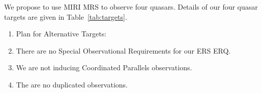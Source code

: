 
\smallskip \smallskip
\noindent
We propose to use MIRI MRS to observe four quasars. Details of our 
four quasar targets are given in Table~\ref{tab:targets}. 

\smallskip \smallskip
\noindent


\begin{enumerate}[label=\alph*]
    \item{Plan for Alternative Targets: }
      
    \item{There are no Special Observational Requirements for our ERS ERQ.} 

    \item{We are not inducing Coordinated Parallels observations.}

    \item{The are no duplicated observations.} 
\end{enumerate}


